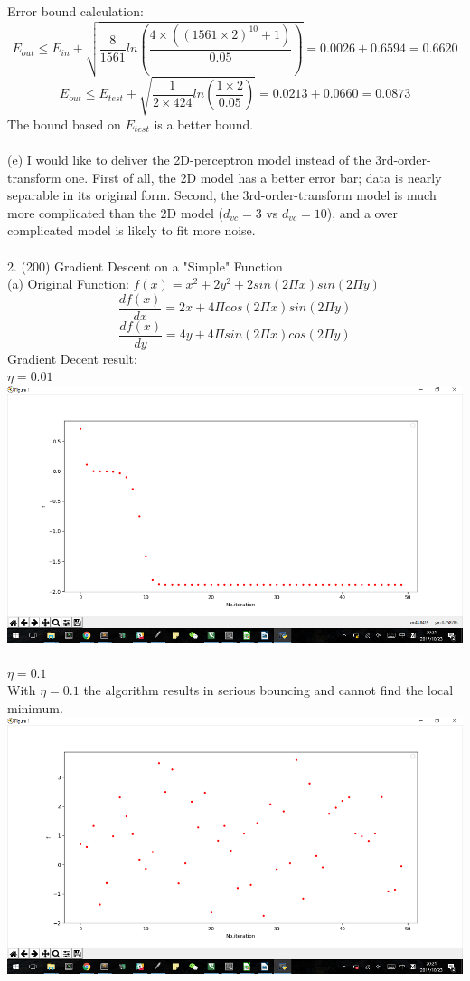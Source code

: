 \documentclass[12pt]{article}
\begin{document}
Error bound calculation:
$$E_{out} \leq  E_{in}+\sqrt{\frac{8}{1561}ln(\frac{4\times ((1561\times 2)^{10}+1)}{0.05})} = 0.0026+0.6594 = 0.6620$$
$$E_{out} \leq  E_{test}+\sqrt{\frac{1}{2\times424}ln(\frac{1\times 2}{0.05})} = 0.0213+0.0660 = 0.0873$$
The bound based on $E_{test}$ is a better bound.\\\\
(e) I would like to deliver the 2D-perceptron model instead of the 3rd-order-transform one. First of all, the 2D model has a better error bar; data is nearly separable in its original form. Second, the 3rd-order-transform model is much more complicated than the 2D model ($d_{vc}=3$ vs $d_{vc}=10$), and a over complicated model is likely to fit more noise.\\\\
2. (200) Gradient Descent on a "Simple" Function\\%
(a) Original Function: $f(x)=x^2+2y^2+2sin(2\Pi x)sin(2\Pi y)$
$$\frac{df(x)}{dx}=2x+4\Pi cos(2\Pi x)sin(2\Pi y)$$
$$\frac{df(x)}{dy}=4y+4\Pi sin(2\Pi x)cos(2\Pi y)$$
Gradient Decent result:\\
$\eta=0.01$\\
\includegraphics[scale=0.6]{image/0d01}\\\\
$\eta=0.1$\\
With $\eta=0.1$ the algorithm results in serious bouncing and cannot find the local minimum.\\
\includegraphics[scale=0.6]{image/0d10}\\\\
\end{document}
